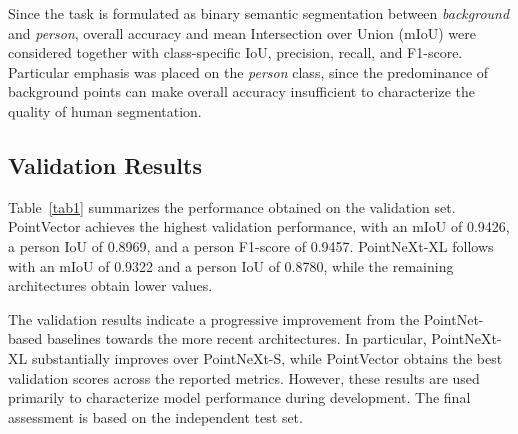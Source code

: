 Since the task is formulated as binary semantic segmentation between \textit{background} and \textit{person}, overall accuracy and mean Intersection over Union (mIoU) were considered together with class-specific IoU, precision, recall, and F1-score. Particular emphasis was placed on the \textit{person} class, since the predominance of background points can make overall accuracy insufficient to characterize the quality of human segmentation.

\subsection{Validation Results}

Table~\ref{tab1} summarizes the performance obtained on the validation set. PointVector achieves the highest validation performance, with an mIoU of 0.9426, a person IoU of 0.8969, and a person F1-score of 0.9457. PointNeXt-XL follows with an mIoU of 0.9322 and a person IoU of 0.8780, while the remaining architectures obtain lower values.

\begin{table}[H]
\centering
\caption{Quantitative validation results obtained by the evaluated segmentation models.}
\label{tab1}
\end{table}

The validation results indicate a progressive improvement from the PointNet-based baselines towards the more recent architectures. In particular, PointNeXt-XL substantially improves over PointNeXt-S, while PointVector obtains the best validation scores across the reported metrics. However, these results are used primarily to characterize model performance during development. The final assessment is based on the independent test set.

